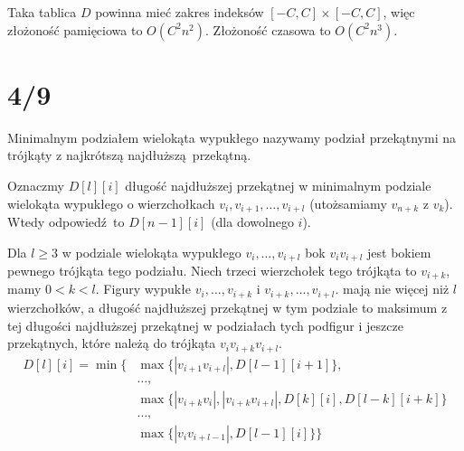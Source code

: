 \documentclass[a4paper, 12pt]{article}
\newcommand{\+}{\enspace}
\begin{document}
Taka tablica $D$ powinna mieć zakres indeksów $[-C,C]×[-C,C]$,
więc złożoność pamięciowa to $O(C^2n^2)$.
Złożoność czasowa to $O(C^2n^3)$.
\fi

\section*{4/9}
Minimalnym podziałem wielokąta wypukłego nazywamy podział przekątnymi na
trójkąty z najkrótszą najdłuższą przekątną.

Oznaczmy $D[l][i]$ długość najdłuższej przekątnej w minimalnym podziale
wielokąta wypukłego
o wierzchołkach $v_i, v_{i+1}, …, v_{i+l}$ (utożsamiamy $v_{n+k}$ z $v_k$).
Wtedy odpowiedź to $D[n-1][i]$ (dla dowolnego $i$).


Dla $l ≥ 3$ w podziale wielokąta wypukłego $v_i, …, v_{i+l}$ bok
$v_iv_{i+l}$ jest bokiem pewnego trójkąta tego podziału.
Niech trzeci wierzchołek tego trójkąta to $v_{i+k}$, mamy
$0 < k < l$.
Figury wypukłe $v_i, …, v_{i+k}$ i $v_{i+k}, …, v_{i+l}$.
mają nie więcej niż $l$ wierzchołków,
a długość najdłuższej przekątnej w tym podziale to maksimum
z tej długości najdłuższej przekątnej w podziałach tych podfigur
i jeszcze przekątnych, które należą do trójkąta $v_iv_{i+k}v_{i+l}$.
\begin{align*}
	D[l][i] = \min \{
	&\max \{ |v_{i+1}v_{i+l}|, D[l-1][i+1] \}, \\
	&…, \\
	&\max \{ |v_{i+k}v_i|, |v_{i+k}v_{i+l}|, D[k][i], D[l-k][i+k] \} \\
	&…, \\
	&\max \{ |v_{i}v_{i+l-1}|, D[l-1][i] \}
\}
\end{align*}
\end{document}
